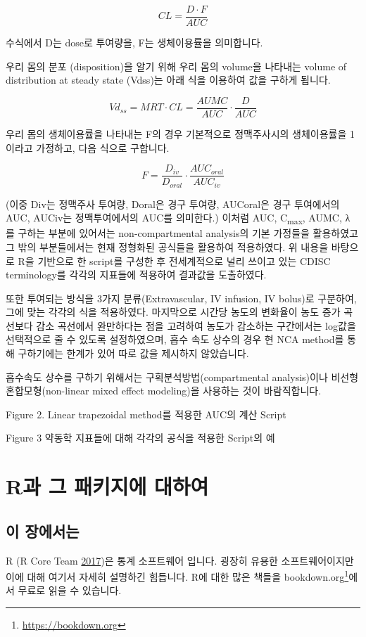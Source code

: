 \documentclass[12pt,]{krantz}
\let\rmarkdownfootnote\footnote%
\def\footnote{\protect\rmarkdownfootnote}
\theoremstyle{definition}
\theoremstyle{definition}
\theoremstyle{definition}
\theoremstyle{remark}
\begin{document}
\[
CL = \frac{D \cdot F}{AUC}
\]

수식에서 D는 dose로 투여량을, F는 생체이용률을 의미합니다.

우리 몸의 분포 (disposition)을 알기 위해 우리 몸의 volume을 나타내는
volume of distribution at steady state (Vdss)는 아래 식을 이용하여 값을
구하게 됩니다.

\[
Vd_{ss} = MRT \cdot CL = \frac{AUMC}{AUC} \cdot \frac{D}{AUC}
\]

우리 몸의 생체이용률을 나타내는 F의 경우 기본적으로 정맥주사시의
생체이용률을 1이라고 가정하고, 다음 식으로 구합니다.

\[
F = \frac{D_{iv}}{D_{oral}} \cdot \frac{AUC_{oral}}{AUC_{iv}}
\]

(이중 Div는 정맥주사 투여량, Doral은 경구 투여량, AUCoral은 경구
투여에서의 AUC, AUCiv는 정맥투여에서의 AUC를 의미한다.) 이처럼 AUC,
C\textsubscript{max}, AUMC, λ 를 구하는 부분에 있어서는
non-compartmental analysis의 기본 가정들을 활용하였고 그 밖의
부분들에서는 현재 정형화된 공식들을 활용하여 적용하였다. 위 내용을
바탕으로 R을 기반으로 한 script를 구성한 후 전세계적으로 널리 쓰이고
있는 CDISC terminology를 각각의 지표들에 적용하여 결과값을 도출하였다.

또한 투여되는 방식을 3가지 분류(Extravascular, IV infusion, IV bolus)로
구분하여, 그에 맞는 각각의 식을 적용하였다. 마지막으로 시간당 농도의
변화율이 농도 증가 곡선보다 감소 곡선에서 완만하다는 점을 고려하여
농도가 감소하는 구간에서는 log값을 선택적으로 줄 수 있도록 설정하였으며,
흡수 속도 상수의 경우 현 NCA method를 통해 구하기에는 한계가 있어 따로
값을 제시하지 않았습니다.

흡수속도 상수를 구하기 위해서는 구획분석방법(compartmental analysis)이나
비선형 혼합모형(non-linear mixed effect modeling)을 사용하는 것이
바람직합니다.

Figure 2. Linear trapezoidal method를 적용한 AUC의 계산 Script

Figure 3 약동학 지표들에 대해 각각의 공식을 적용한 Script의 예

\chapter{R과 그 패키지에 대하여}\label{R-and-packages}

\section{이 장에서는}\label{summary-r-packages}

R (R Core Team \protect\hyperlink{ref-R-base}{2017})은 통계 소프트웨어
입니다. 굉장히 유용한 소프트웨어이지만 이에 대해 여기서 자세히 설명하긴
힘듭니다. R에 대한 많은 책들을 bookdown.org\footnote{\url{https://bookdown.org}}에서
무료로 읽을 수 있습니다.
\end{document}
